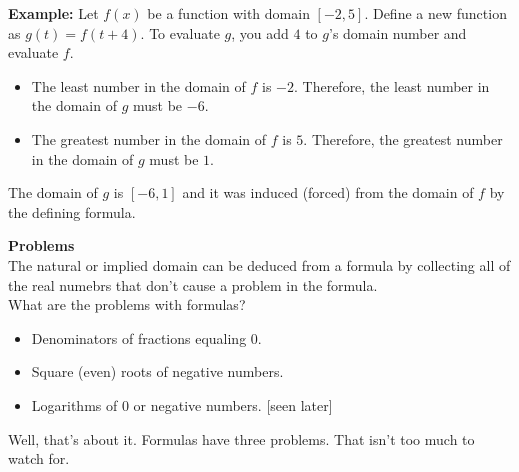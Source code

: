 \documentclass{ximera}
\begin{document}
\begin{enumerate}
\textbf{Example:}  Let $f(x)$ be a function with domain $[-2, 5]$.  Define a new function as $g(t) = f(t+4)$.  To evaluate $g$, you add $4$ to $g$'s domain number and evaluate $f$.  

\begin{itemize}
\item The least number in the domain of $f$ is $-2$.  Therefore, the least number in the domain of $g$ must be $-6$.
\item The greatest number in the domain of $f$ is $5$.  Therefore, the greatest number in the domain of $g$ must be $1$.
\end{itemize} 

The domain of $g$ is $[-6, 1]$ and it was induced (forced) from the domain of $f$ by the defining formula.


\end{enumerate}




\begin{warning} \textbf{\textcolor{red!90!darkgray}{Problems}}   \\

The natural or implied domain can be deduced from a formula by collecting all of the real numebrs that don't cause a problem in the formula. \\

What are the problems with formulas?

\begin{itemize}
\item  Denominators of fractions equaling $0$. \\
\item  Square (even) roots of negative numbers.    \\
\item  Logarithms of $0$ or negative numbers.  [seen later] 
\end{itemize}

Well, that's about it.  Formulas have three problems.  That isn't too much to watch for.


\end{warning}
\end{document}
